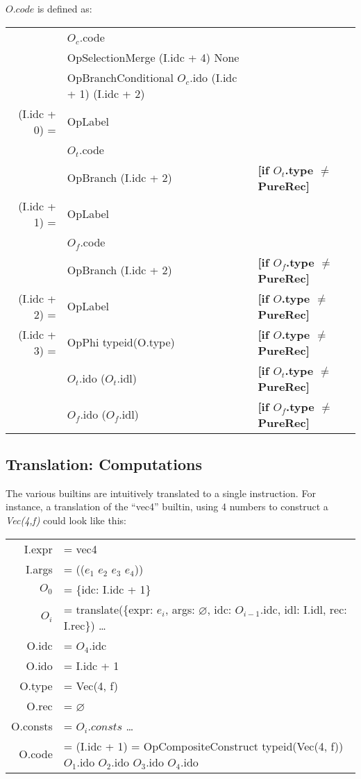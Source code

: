 \documentclass[letterpaper,12pt]{article}
\begin{document}
\medskip
$O.code$ is defined as: \\
\begin{tabularx}{\linewidth}{rll}
	& $O_c$.code \\
	& OpSelectionMerge (I.idc + 4) None \\
	& OpBranchConditional $O_c$.ido (I.idc + 1) (I.idc + 2) \\
	\cline{1-2}
	(I.idc + 0) = &OpLabel \\
	& $O_t$.code \\
	& OpBranch (I.idc + 2) & \textbf{[if $O_t$.type $\neq$ PureRec]} \\
	\cline{1-2}
	(I.idc + 1) = &OpLabel \\
	& $O_f$.code \\
	& OpBranch (I.idc + 2) & \textbf{[if $O_f$.type $\neq$ PureRec]} \\
	\cline{1-2}
	(I.idc + 2) = &OpLabel & \textbf{[if $O$.type $\neq$ PureRec]} \\
	(I.idc + 3) = &OpPhi typeid(O.type) & \textbf{[if $O$.type $\neq$ PureRec]} \\
		& \quad $O_t$.ido ($O_t$.idl) & \quad \textbf{[if $O_t$.type $\neq$ PureRec]} \\
		& \quad $O_f$.ido ($O_f$.idl) & \quad \textbf{[if $O_f$.type $\neq$ PureRec]} \\
\end{tabularx}

\subsection{Translation: Computations}

The various builtins are intuitively translated to a single instruction.
For instance, a translation of the ``vec4'' builtin, using
4 numbers to construct a \textit{Vec(4,f)} could look like this:

\medskip
\begin{tabularx}{\linewidth}{rl}
	I.expr &= vec4 \\
	I.args &= (($e_1$ $e_2$ $e_3$ $e_4$)) \\
	$O_0$ &= \{idc: I.idc + 1\} \\
	$O_i$ &= translate(\{expr: $e_i$, args: $\varnothing$, idc: $O_{i - 1}$.idc, idl: I.idl, rec: I.rec\}) \dots \\
	O.idc &= $O_4$.idc \\
	O.ido &= I.idc + 1 \\
	O.type &= Vec(4, f) \\
	O.rec &= $\varnothing$ \\
	O.consts &= $O_i.consts$ \dots \\
	O.code &= (I.idc + 1) = OpCompositeConstruct typeid(Vec(4, f)) $O_1$.ido $O_2$.ido $O_3$.ido $O_4$.ido \\
\end{tabularx}
\end{document}

